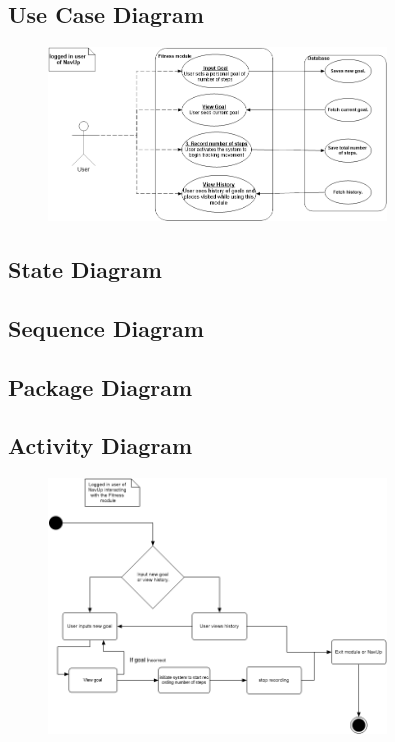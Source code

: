 \subsection{Use Case Diagram}
\begin{figure}[!h]
  \includegraphics[width=0.8\textwidth]{Fitness/FitnessUseCase.png}
\end{figure}

\subsection{State Diagram}

\subsection{Sequence Diagram}

\subsection{Package Diagram}

\subsection{Activity Diagram}
\begin{figure}[!h]
  \includegraphics[width=0.8\textwidth]{Fitness/FitnessActivitydiagram.png}
\end{figure}

